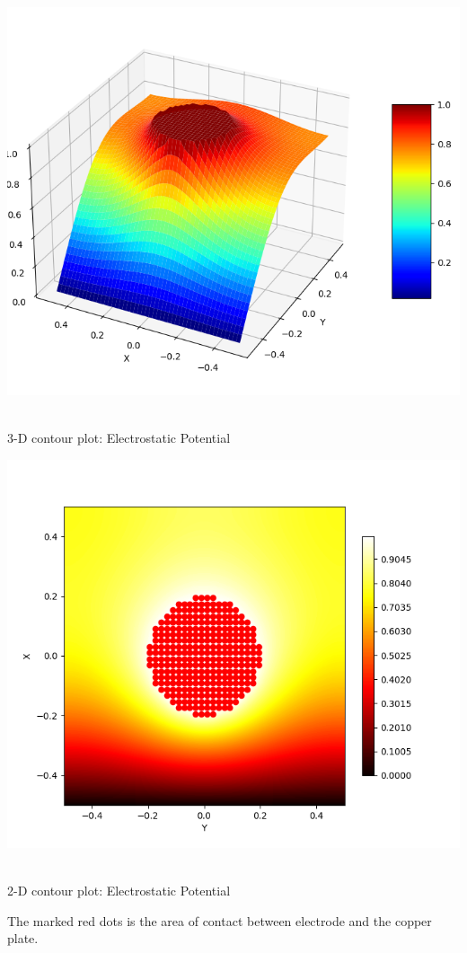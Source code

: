 \documentclass[12pt, a4paper]{report}
\begin{document}
\begin{center}
	\includegraphics[scale=0.60]{Figure3} 
	\caption{\\3-D contour plot: Electrostatic Potential}
	\label{fig:rawdata}
\end{center}


\begin{center}
	\includegraphics[scale=0.60]{Figure4} 
	\caption{\\2-D contour plot: Electrostatic Potential}
	\label{fig:rawdata}
\end{center}
The marked red dots is the area of contact between electrode and the copper plate.
\end{document}
